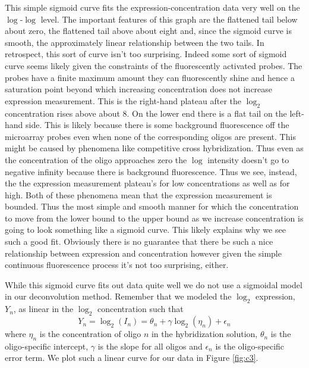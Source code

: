 \documentclass[reqno,12pt,oneside]{report}\usepackage[]{graphicx}\usepackage[]{color}
\theoremstyle{plain}
\theoremstyle{definition}
\theoremstyle{remark}
\numberwithin{theorem}{chapter}     %
\begin{document}
This simple sigmoid curve fits the expression-concentration data very well on the $\log$-$\log$ level. The important features of this graph are the flattened tail below about zero, the flattened tail above about eight and, since the sigmoid curve is smooth, the approximately linear relationship between the two tails. In retrospect, this sort of curve isn't too surprising. Indeed some sort of sigmoid curve seems likely given the constraints of the fluorescently activated probes. The probes have a finite maximum amount they can fluorescently shine and hence a saturation point beyond which increasing concentration does not increase expression measurement. This is the right-hand plateau after the $\log_2$ concentration rises above about $8$. On the lower end there is a flat tail on the left-hand side. This is likely because there is some background fluorescence off the microarray probes even when none of the corresponding oligos are present. This might be caused by phenomena like competitive cross hybridization. Thus even as the concentration of the oligo approaches zero the $\log$ intensity doesn't go to negative infinity because there is background fluorescence. Thus we see, instead, the the expression measurement plateau's for low concentrations as well as for high. Both of these phenomena mean that the expression measurement is bounded. Thus the most simple and smooth manner for which the concentration to move from the lower bound to the upper bound as we increase concentration is going to look something like a sigmoid curve. This likely explains why we see such a good fit. Obviously there is no guarantee that there be such a nice relationship between expression and concentration however given the simple continuous fluorescence process it's not too surprising, either.


While this sigmoid curve fits out data quite well we do not use a sigmoidal model in our deconvolution method. Remember that we modeled the $\log_2$ expression, $Y_n$, as linear in the $\log_2$ concentration such that 
\[
Y_n =\log_2(I_n) = \theta_n + \gamma\log_2\left(\eta_n\right) + \epsilon_n
\]
where $\eta_n$ is the concentration of oligo $n$ in the hybridization solution, $\theta_n$ is the oligo-specific intercept, $\gamma$ is the slope for all oligos and $\epsilon_n$ is the oligo-specific error term. We plot such a linear curve for our data in Figure \ref{fig:c3}.
\end{document}
